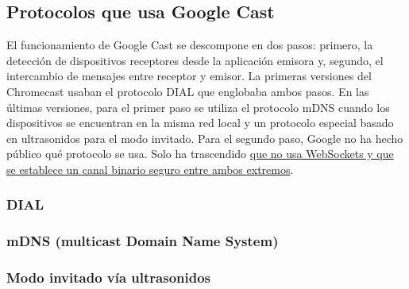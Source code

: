 \subsection{Protocolos que usa Google Cast}

El funcionamiento de Google Cast se descompone en dos pasos: primero, la detección de dispositivos receptores desde la aplicación emisora y, segundo, el intercambio de mensajes entre receptor y emisor.
La primeras versiones del Chromecast usaban el protocolo DIAL que englobaba ambos pasos.
En las últimas versiones, para el primer paso se utiliza el protocolo mDNS cuando los dispositivos se encuentran en la misma red local y un protocolo especial basado en ultrasonidos para el modo invitado. Para el segundo paso, Google no ha hecho público qué protocolo se usa. Solo ha trascendido \href{https://plus.google.com/116723992087294619013/posts/d6TLN4S8mrH}{que no usa WebSockets y que se establece un canal binario seguro entre ambos extremos}.

\subsubsection{DIAL}


\subsubsection{mDNS (multicast Domain Name System)}


\subsubsection{Modo invitado vía ultrasonidos}

